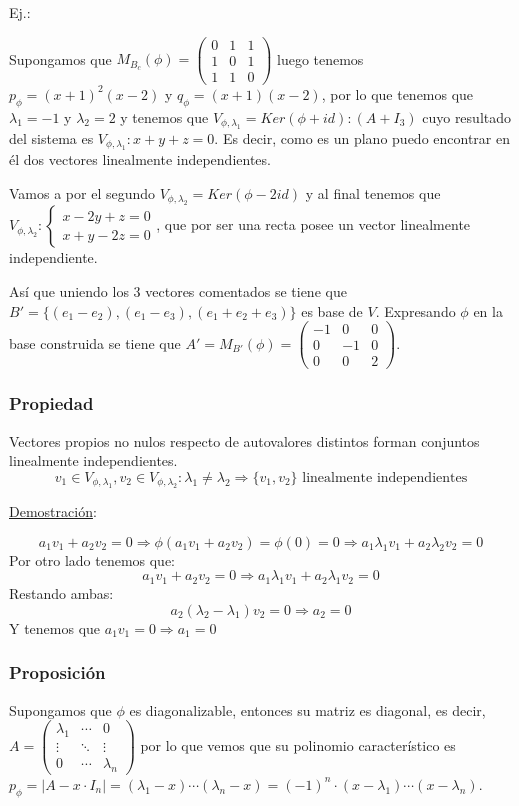 \documentclass[10pt,a4paper,openright]{book}
\begin{document}
Ej.:

Supongamos que $M_{B_c}(\phi)=\begin{pmatrix}
0&1&1\\1&0&1\\1&1&0
\end{pmatrix}$ luego tenemos $p_\phi= (x+1)^2(x-2)$ y $q_\phi=(x+1)(x-2)$, por lo que tenemos que $\lambda_1 = -1$ y $\lambda_2 = 2$ y tenemos que $V_{\phi, \lambda_1}= Ker(\phi+id): (A+I_3)$ cuyo resultado del sistema es $V_{\phi, \lambda_1}:x+y+z=0$. Es decir, como es un plano puedo encontrar en él dos vectores linealmente independientes.

Vamos a por el segundo $V_{\phi,\lambda_2}=Ker(\phi-2id)$ y al final tenemos que $V_{\phi,\lambda_2}:\begin{cases}x-2y+z=0 \\ x+y-2z=0\end{cases}$, que por ser una recta posee un vector linealmente independiente.

Así que uniendo los 3 vectores comentados se tiene que $B'=\{(e_1-e_2), (e_1-e_3), (e_1+e_2+e_3)\}$ es base de $V$. Expresando $\phi$ en la base construida se tiene que $A'=M_{B'}(\phi)=\begin{pmatrix}-1&0&0\\0&-1&0\\0&0&2\end{pmatrix}$.

\subsubsection*{Propiedad}
Vectores propios no nulos respecto de autovalores distintos forman conjuntos linealmente independientes.
$$v_1\in V_{\phi, \lambda_1}, v_2\in V_{\phi,\lambda_2}: \lambda_1 \neq \lambda_2\Rightarrow \{v_1,v_2\}\mbox{ linealmente independientes}$$

\underline{Demostración}:

$$a_1v_1+a_2v_2=0\Rightarrow \phi(a_1v_1+a_2v_2)=\phi(0)=0\Rightarrow a_1\lambda_1v_1+a_2\lambda_2v_2=0$$
Por otro lado tenemos que:
$$a_1v_1+a_2v_2=0\Rightarrow a_1\lambda_1v_1+a_2\lambda_1v_2=0$$
Restando ambas:
$$a_2(\lambda_2-\lambda_1)v_2=0\Rightarrow a_2=0$$
Y tenemos que $a_1v_1=0\Rightarrow a_1=0$

\subsubsection*{Proposición}
Supongamos que $\phi$ es diagonalizable, entonces su matriz es diagonal, es decir, $A=\begin{pmatrix}\lambda_1 &\cdots &0\\ \vdots &\ddots & \vdots\\ 0 &\cdots &\lambda_n\end{pmatrix}$ por lo que vemos que su polinomio característico es $p_\phi = |A-x\cdot I_n|=(\lambda_1-x)\cdots (\lambda_n-x)=(-1)^n\cdot (x-\lambda_1)\cdots (x-\lambda_n)$.
\end{document}
